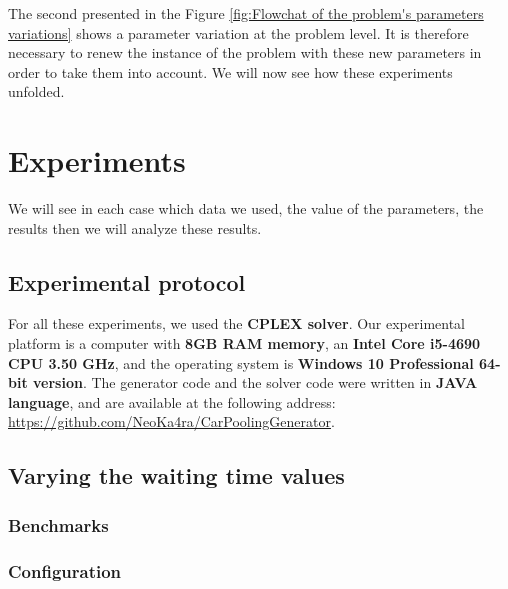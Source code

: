 \documentclass[12pt, a4paper,twoside]{memoir}
\newcommand{\newpar}{\vskip 0.2in \noindent}
\begin{document}
	\noindent The second presented in the Figure \ref{fig:Flowchat of the problem's parameters variations} shows a parameter variation at the problem level. It is therefore necessary to renew the instance of the problem with these new parameters in order to take them into account.
	\newpar
	We will now see how these experiments unfolded.
	
	\cleardoublepage
	\chapter{Experiments}
	
	We will see in each case which data we used, the value of the parameters, the results then we will analyze these results.
	
	\section{Experimental protocol}
	
	For all these experiments, we used the \textbf{CPLEX solver}. Our experimental platform is a computer with \textbf{8GB RAM memory}, an \textbf{Intel Core i5-4690 CPU 3.50 GHz}, and the operating system is \textbf{Windows 10 Professional 64-bit version}. The generator code and the solver code were written in \textbf{JAVA language}, and are available at the following address: \url{https://github.com/NeoKa4ra/CarPoolingGenerator}.
	
	\section{Varying the waiting time values}
	\subsection{Benchmarks}
	\subsection{Configuration}
\end{document}
